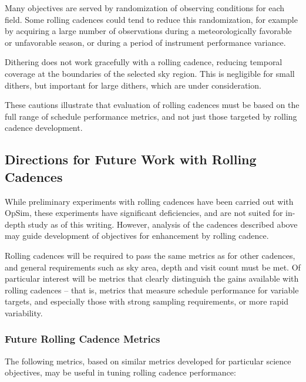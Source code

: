 Many objectives are served by randomization of observing conditions for
each field.  Some rolling cadences could tend to reduce this
randomization, for example by acquiring a large number of observations
during a meteorologically favorable or unfavorable season, or during a
period of instrument performance variance.

Dithering does not work gracefully with a rolling cadence, reducing
temporal coverage at the boundaries of the selected sky region.  This is
negligible for small dithers, but important for large dithers, which are
under consideration.

These cautions illustrate that evaluation of rolling cadences must be
based on the full range of schedule performance metrics, and not just
those targeted by rolling cadence development.



\subsection{Directions for Future Work with Rolling Cadences}
\label{sec:rolling:directions}

While preliminary experiments with rolling cadences have been carried
out with OpSim, these experiments have significant deficiencies, and are
not suited for in-depth study as of this writing.
However, analysis of the cadences described above may guide
development of objectives for enhancement by rolling cadence.

Rolling cadences will be required to pass the same metrics as for other
cadences, and general requirements such as sky area, depth and visit
count must be met.  Of particular interest will be metrics that clearly
distinguish the gains available with rolling cadences -- that is,
metrics that measure schedule performance for variable targets, and
especially those with strong sampling requirements, or more rapid
variability.

\subsubsection{Future Rolling Cadence Metrics}

The following metrics, based on similar metrics developed for particular
science objectives, may be useful in tuning rolling cadence performance:

